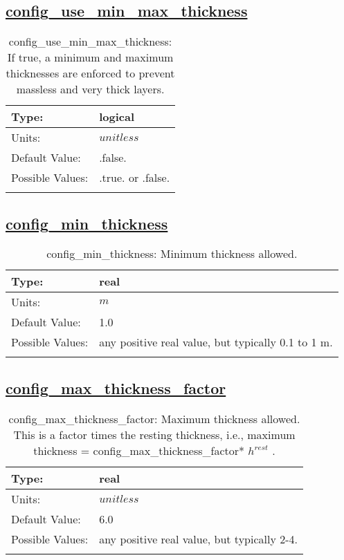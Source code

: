 \subsection[config\_use\_min\_max\_thickness]{\hyperref[sec:nm_tab_ALE_vertical_grid]{config\_use\_min\_max\_thickness}}
\label{subsec:nm_sec_config_use_min_max_thickness}
\begin{center}
\begin{longtable}{| p{2.0in} || p{4.0in} |}
    \hline
    Type: & logical \\
    \hline
    Units: & $unitless$ \\
    \hline
    Default Value: & .false. \\
    \hline
    Possible Values: & .true. or .false. \\
    \hline
    \caption{config\_use\_min\_max\_thickness: If true, a minimum and maximum thicknesses are enforced to prevent massless and very thick layers.}
\end{longtable}
\end{center}
\subsection[config\_min\_thickness]{\hyperref[sec:nm_tab_ALE_vertical_grid]{config\_min\_thickness}}
\label{subsec:nm_sec_config_min_thickness}
\begin{center}
\begin{longtable}{| p{2.0in} || p{4.0in} |}
    \hline
    Type: & real \\
    \hline
    Units: & $m$ \\
    \hline
    Default Value: & 1.0 \\
    \hline
    Possible Values: & any positive real value, but typically 0.1 to 1 m. \\
    \hline
    \caption{config\_min\_thickness: Minimum thickness allowed.}
\end{longtable}
\end{center}
\subsection[config\_max\_thickness\_factor]{\hyperref[sec:nm_tab_ALE_vertical_grid]{config\_max\_thickness\_factor}}
\label{subsec:nm_sec_config_max_thickness_factor}
\begin{center}
\begin{longtable}{| p{2.0in} || p{4.0in} |}
    \hline
    Type: & real \\
    \hline
    Units: & $unitless$ \\
    \hline
    Default Value: & 6.0 \\
    \hline
    Possible Values: & any positive real value, but typically 2-4. \\
    \hline
    \caption{config\_max\_thickness\_factor:  Maximum thickness allowed. This is a factor times the resting thickness, i.e., maximum thickness = config\_max\_thickness\_factor* $h^{rest}$ .}
\end{longtable}
\end{center}
